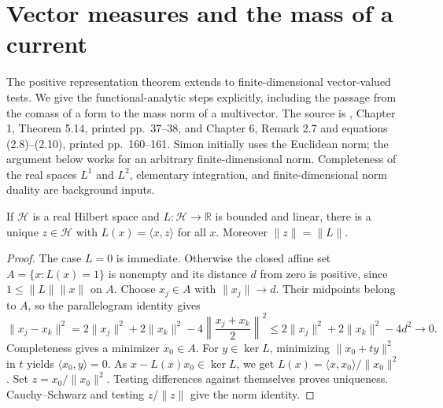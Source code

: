 \chapter{Vector measures and the mass of a current}\label{sec:vector-measure-representation}
The positive representation theorem extends to finite-dimensional vector-valued tests. We give the functional-analytic steps explicitly, including the passage from the comass of a form to the mass norm of a multivector. The source is \cite{Sim18}, Chapter 1, Theorem 5.14, printed pp.~37--38, and Chapter 6, Remark 2.7 and equations (2.8)--(2.10), printed pp.~160--161. Simon initially uses the Euclidean norm; the argument below works for an arbitrary finite-dimensional norm. Completeness of the real spaces $L^1$ and $L^2$, elementary integration, and finite-dimensional norm duality are background inputs.

\begin{lemma}\label{lem:hilbert-functional-representation}
If $\mathcal H$ is a real Hilbert space and $L:\mathcal H\to\mathbb R$ is bounded and linear, there is a unique $z\in\mathcal H$ with $L(x)=\langle x,z\rangle$ for all $x$. Moreover $\|z\|=\|L\|$.
\end{lemma}
\begin{proof}
The case $L=0$ is immediate. Otherwise the closed affine set $A=\{x:L(x)=1\}$ is nonempty and its distance $d$ from zero is positive, since $1\leq\|L\|\|x\|$ on $A$. Choose $x_j\in A$ with $\|x_j\|\to d$. Their midpoints belong to $A$, so the parallelogram identity gives
\[
 \|x_j-x_k\|^2=2\|x_j\|^2+2\|x_k\|^2-4\left\|\frac{x_j+x_k}{2}\right\|^2
 \leq2\|x_j\|^2+2\|x_k\|^2-4d^2\longrightarrow0.
\]
Completeness gives a minimizer $x_0\in A$. For $y\in\ker L$, minimizing $\|x_0+ty\|^2$ in $t$ yields $\langle x_0,y\rangle=0$. As $x-L(x)x_0\in\ker L$, we get $L(x)=\langle x,x_0\rangle/\|x_0\|^2$. Set $z=x_0/\|x_0\|^2$. Testing differences against themselves proves uniqueness. Cauchy--Schwarz and testing $z/\|z\|$ give the norm identity.
\end{proof}

